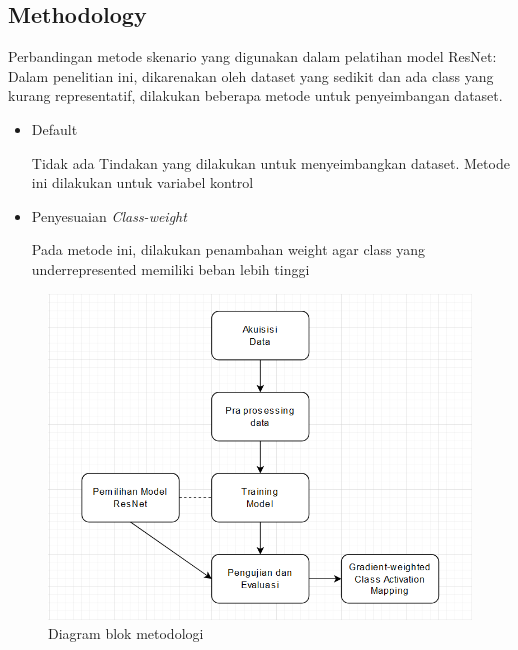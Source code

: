 \subsection{Methodology}
\label{subsec:loremipsum}

Perbandingan metode skenario yang digunakan dalam pelatihan model ResNet:
Dalam penelitian ini, dikarenakan oleh dataset yang sedikit dan ada class yang kurang representatif, dilakukan beberapa metode untuk penyeimbangan dataset.
\begin{itemize}
	\item Default
	
	Tidak ada Tindakan yang dilakukan untuk menyeimbangkan dataset. Metode ini dilakukan untuk variabel kontrol
	\item Penyesuaian \emph{Class-weight}
	
	Pada metode ini, dilakukan penambahan weight agar class yang underrepresented memiliki beban lebih tinggi
\end{itemize}

\begin{figure}[hbtp] \centering
	\includegraphics[scale=0.5]{gambar/diagramMethod.png}
	\caption{Diagram blok metodologi}
	\label{fig:diagramMethod}
\end{figure}

